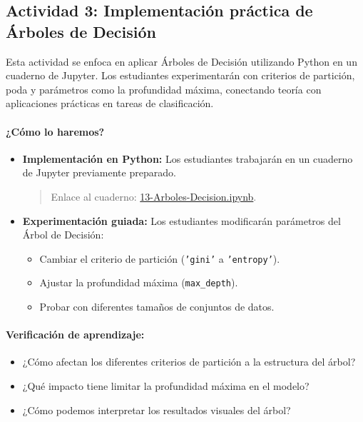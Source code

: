 \documentclass[a4,11pt]{aleph-notas}
\begin{document}
\subsection*{Actividad 3: Implementación práctica de Árboles de Decisión}

Esta actividad se enfoca en aplicar Árboles de Decisión utilizando Python en un cuaderno de Jupyter. Los estudiantes experimentarán con criterios de partición, poda y parámetros como la profundidad máxima, conectando teoría con aplicaciones prácticas en tareas de clasificación.

\paragraph{¿Cómo lo haremos?}  
\begin{itemize}[leftmargin=*]  
    \item \textbf{Implementación en Python:} Los estudiantes trabajarán en un cuaderno de Jupyter previamente preparado.  
    \begin{quote}  
        Enlace al cuaderno: \href{https://colab.research.google.com/github/andres-merino/AprendizajeAutomaticoInicial-05-N0105/blob/main/2-Notebooks/18-Arboles-Decision.ipynb}{13-Arboles-Decision.ipynb}.  
    \end{quote}  
    \item \textbf{Experimentación guiada:} Los estudiantes modificarán parámetros del Árbol de Decisión:  
        \begin{itemize}[leftmargin=*]  
            \item Cambiar el criterio de partición (\texttt{'gini'} a \texttt{'entropy'}).  
            \item Ajustar la profundidad máxima (\texttt{max\_depth}).  
            \item Probar con diferentes tamaños de conjuntos de datos.  
        \end{itemize}  
\end{itemize}  

\paragraph{Verificación de aprendizaje:}  
\begin{itemize}[leftmargin=*]  
    \item ¿Cómo afectan los diferentes criterios de partición a la estructura del árbol?  
    \item ¿Qué impacto tiene limitar la profundidad máxima en el modelo?  
    \item ¿Cómo podemos interpretar los resultados visuales del árbol?  
\end{itemize}  
\end{document}
